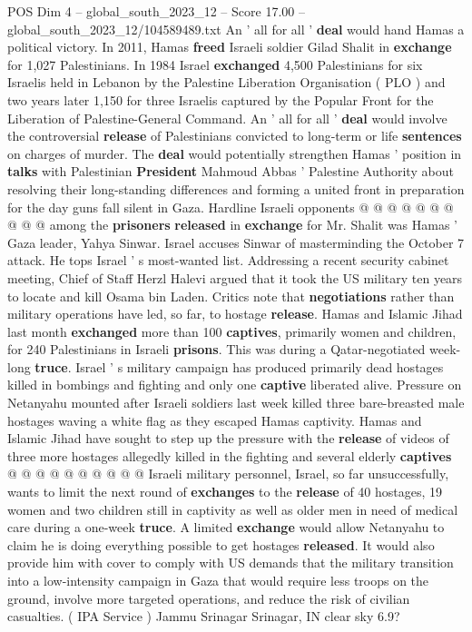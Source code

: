 \begin{textsample}{POS Dim 4 – global\_south\_2023\_12 – Score 17.00 – global\_south\_2023\_12/104589489.txt}
An ' all for all ' \textbf{deal} would hand Hamas a political victory.
In 2011, Hamas \textbf{freed} Israeli soldier Gilad Shalit in \textbf{exchange} for 1,027 Palestinians.
In 1984 Israel \textbf{exchanged} 4,500 Palestinians for six Israelis held in Lebanon by the Palestine Liberation Organisation ( PLO ) and two years later 1,150 for three Israelis captured by the Popular Front for the Liberation of Palestine-General Command.
An ' all for all ' \textbf{deal} would involve the controversial \textbf{release} of Palestinians convicted to long-term or life \textbf{sentences} on charges of murder.
The \textbf{deal} would potentially strengthen Hamas ' position in \textbf{talks} with Palestinian \textbf{President} Mahmoud Abbas ' Palestine Authority about resolving their long-standing differences and forming a united front in preparation for the day guns fall silent in Gaza.
Hardline Israeli opponents @ @ @ @ @ @ @ @ @ @ among the \textbf{prisoners} \textbf{released} in \textbf{exchange} for Mr.
Shalit was Hamas ' Gaza leader, Yahya Sinwar.
Israel accuses Sinwar of masterminding the October 7 attack.
He tops Israel ' s most-wanted list.
Addressing a recent security cabinet meeting, Chief of Staff Herzl Halevi argued that it took the US military ten years to locate and kill Osama bin Laden.
Critics note that \textbf{negotiations} rather than military operations have led, so far, to hostage \textbf{release}.
Hamas and Islamic Jihad last month \textbf{exchanged} more than 100 \textbf{captives}, primarily women and children, for 240 Palestinians in Israeli \textbf{prisons}.
This was during a Qatar-negotiated week-long \textbf{truce}.
Israel ' s military campaign has produced primarily dead hostages killed in bombings and fighting and only one \textbf{captive} liberated alive.
Pressure on Netanyahu mounted after Israeli soldiers last week killed three bare-breasted male hostages waving a white flag as they escaped Hamas captivity.
Hamas and Islamic Jihad have sought to step up the pressure with the \textbf{release} of videos of three more hostages allegedly killed in the fighting and several elderly \textbf{captives} @ @ @ @ @ @ @ @ @ @ Israeli military personnel, Israel, so far unsuccessfully, wants to limit the next round of \textbf{exchanges} to the \textbf{release} of 40 hostages, 19 women and two children still in captivity as well as older men in need of medical care during a one-week \textbf{truce}.
A limited \textbf{exchange} would allow Netanyahu to claim he is doing everything possible to get hostages \textbf{released}.
It would also provide him with cover to comply with US demands that the military transition into a low-intensity campaign in Gaza that would require less troops on the ground, involve more targeted operations, and reduce the risk of civilian casualties. ( IPA Service ) Jammu Srinagar Srinagar, IN clear sky 6.9?

\end{textsample}
